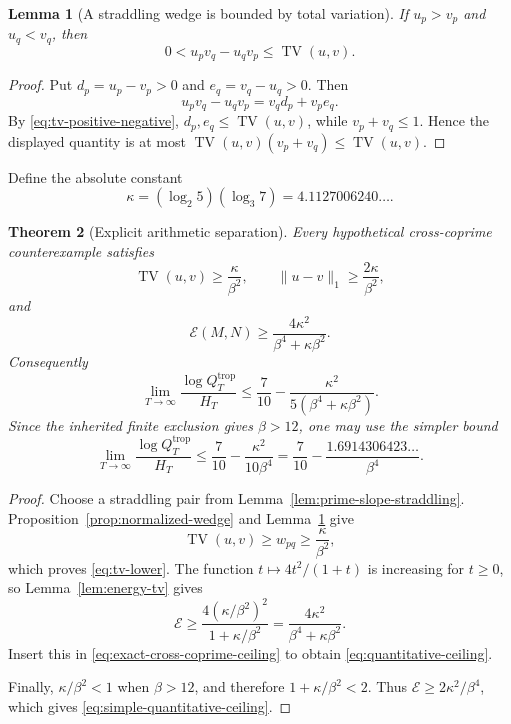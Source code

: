 \documentclass[11pt,oneside]{article}
\theoremstyle{research}
\newtheorem{theorem}{Theorem}[section]
\newtheorem{lemma}[theorem]{Lemma}
\theoremstyle{definition}
\newcommand{\E}{\mathcal E}
\newcommand{\TV}{\operatorname{TV}}
\newcommand{\trop}{\mathrm{trop}}
\begin{document}
\begin{lemma}[A straddling wedge is bounded by total variation]
\label{lem:wedge-tv}
If $u_p>v_p$ and $u_q<v_q$, then
\begin{equation}
 0<u_pv_q-u_qv_p\le\TV(u,v).
 \label{eq:wedge-tv}
\end{equation}
\end{lemma}

\begin{proof}
Put $d_p=u_p-v_p>0$ and $e_q=v_q-u_q>0$.  Then
\[
 u_pv_q-u_qv_p=v_qd_p+v_pe_q.
\]
By \eqref{eq:tv-positive-negative}, $d_p,e_q\le\TV(u,v)$, while
$v_p+v_q\le1$.  Hence the displayed quantity is at most
$\TV(u,v)(v_p+v_q)\le\TV(u,v)$.
\end{proof}

Define the absolute constant
\begin{equation}
 \kappa
 =(\log_2 5)(\log_3 7)
 =4.1127006240\ldots .
 \label{eq:kappa}
\end{equation}

\begin{theorem}[Explicit arithmetic separation]
\label{thm:explicit-energy-gap}
Every hypothetical cross-coprime counterexample satisfies
\begin{equation}
 \TV(u,v)\ge\frac{\kappa}{\beta^2},
 \qquad
 \|u-v\|_1\ge\frac{2\kappa}{\beta^2},
 \label{eq:tv-lower}
\end{equation}
and
\begin{equation}
 \E(M,N)
 \ge
 \frac{4\kappa^2}{\beta^4+\kappa\beta^2}.
 \label{eq:energy-lower}
\end{equation}
Consequently
\begin{equation}
 \lim_{T\to\infty}\frac{\log Q_T^{\trop}}{H_T}
 \le
 \frac7{10}
 -\frac{\kappa^2}{5(\beta^4+\kappa\beta^2)}.
 \label{eq:quantitative-ceiling}
\end{equation}
Since the inherited finite exclusion gives $\beta>12$, one may use the simpler
bound
\begin{equation}
 \lim_{T\to\infty}\frac{\log Q_T^{\trop}}{H_T}
 \le
 \frac7{10}-\frac{\kappa^2}{10\beta^4}
 =\frac7{10}-\frac{1.6914306423\ldots}{\beta^4}.
 \label{eq:simple-quantitative-ceiling}
\end{equation}
\end{theorem}

\begin{proof}
Choose a straddling pair from Lemma~\ref{lem:prime-slope-straddling}.
Proposition~\ref{prop:normalized-wedge} and Lemma~\ref{lem:wedge-tv} give
\[
 \TV(u,v)\ge w_{pq}\ge\frac\kappa{\beta^2},
\]
which proves \eqref{eq:tv-lower}.  The function
$t\mapsto4t^2/(1+t)$ is increasing for $t\ge0$, so
Lemma~\ref{lem:energy-tv} gives
\[
 \E\ge
 \frac{4(\kappa/\beta^2)^2}{1+\kappa/\beta^2}
 =\frac{4\kappa^2}{\beta^4+\kappa\beta^2}.
\]
Insert this in \eqref{eq:exact-cross-coprime-ceiling} to obtain
\eqref{eq:quantitative-ceiling}.

Finally, $\kappa/\beta^2<1$ when $\beta>12$, and therefore
$1+\kappa/\beta^2<2$.  Thus
$\E\ge2\kappa^2/\beta^4$, which gives
\eqref{eq:simple-quantitative-ceiling}.
\end{proof}
\end{document}
